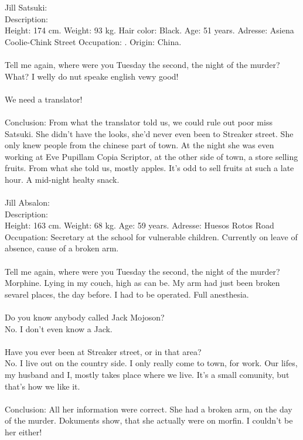 \documentclass[]{article}
\begin{document}
Jill Satsuki: \\
Description: \\ Height: 174 cm. Weight: 93 kg. Hair color: Black. Age: 51 years. Adresse: Asiena Coolie-Chink Street  Occupation: . Origin: China.
\\ \\
Tell me again, where were you Tuesday the second, the night of the murder? \\
What? I welly do nut speake english vewy good! \\ \\
We need a translator! \\ \\
Conclusion: From what the translator told us, we could rule out poor miss Satsuki. She didn't have the looks, she'd never even been to Streaker street. She only knew people from the chinese part of town. At the night she was even working at Eve Pupillam Copia Scriptor, at the other side of town, a store selling fruits. From what she told us, mostly apples. It's odd to sell fruits at such a late hour. A mid-night healty snack.
\\ \\

Jill Absalon: \\
Description: \\ Height: 163 cm. Weight: 68 kg. Age: 59 years. Adresse: Huesos Rotos Road Occupation: Secretary at the school for vulnerable children. Currently on leave of absence, cause of a broken arm.
\\ \\
Tell me again, where were you Tuesday the second, the night of the murder? \\
Morphine. Lying in my couch, high as can be. My arm had just been broken sevarel places, the day before. I had to be operated. Full anesthesia.
\\ \\
Do you know anybody called Jack Mojoson? \\
No. I don't even know a Jack. 
\\ \\
Have you ever been at Streaker street, or in that area? \\ 
No. I live out on the country side. I only really come to town, for work. Our lifes, my husband and I, mostly takes place where we live. It's a small comunity, but that's how we like it.
\\ \\
Conclusion: All her information were correct. She had a broken arm, on the day of the murder. Dokuments show, that she actually were on morfin. I couldn't be her either!
\end{document}
